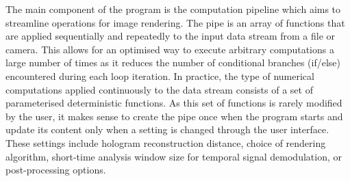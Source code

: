 The main component of the program is the computation pipeline which aims to streamline operations for image rendering. The pipe is an array of functions that are applied sequentially and repeatedly to the input data stream from a file or camera. This allows for an optimised way to execute arbitrary computations a large number of times as it reduces the number of conditional branches (if/else) encountered during each loop iteration. In practice, the type of numerical computations applied continuously to the data stream consists of a set of parameterised deterministic functions. As this set of functions is rarely modified by the user, it makes sense to create the pipe once when the program starts and update its content only when a setting is changed through the user interface. These settings include hologram reconstruction distance, choice of rendering algorithm, short-time analysis window size for temporal signal demodulation, or post-processing options.